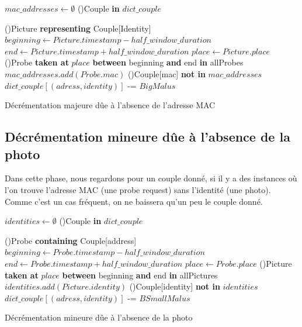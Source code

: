 \begin{algorithm2e}[H]
	\SetAlgoLined
	$mac\_addresses  \gets \emptyset $\;
	\ForEach(){Couple \textbf{in} $dict\_couple$}{
		 \ForEach(){Picture \textbf{representing} Couple[Identity]}{
			$beginning \gets Picture.timestamp - half\_window\_duration$\;
			$end \gets Picture.timestamp + half\_window\_duration$\;
			$place \gets Picture.place$\; 
			\ForEach(){Probe \textbf{taken at} $place$ \textbf{between} beginning \textbf{and} end \textbf{in} allProbes}{
				$mac\_addresses.add(Probe.mac)$
			 }
			}
		\If(){Couple[mac] \textbf{not in} $mac\_addresses$}{
			$dict\_couple[(adress, identity)]$ -= $BigMalus$\;
		}

		}
	\caption{Décrémentation majeure dûe à l'absence de l'adresse MAC}
\end{algorithm2e}


\subsection{Décrémentation mineure dûe à l'absence de la photo}
Dans cette phase, nous regardons pour un couple donné, si il y a des instances où l'on trouve 
l'adresse MAC (une probe request) sans l'identité (une photo). Comme c'est un cas fréquent, on ne baissera qu'un peu le couple donné. 


\begin{algorithm2e}[H]
	\SetAlgoLined
	$identities  \gets \emptyset $\;
	\ForEach(){Couple \textbf{in} $dict\_couple$}{
		 \ForEach(){Probe \textbf{containing} Couple[address]}{
			$beginning \gets Probe.timestamp - half\_window\_duration$\;
			$end \gets Probe.timestamp + half\_window\_duration$\;
			$place \gets Probe.place$\; 
			\ForEach(){Picture \textbf{taken at} $place$ \textbf{between} beginning \textbf{and} end \textbf{in} allPictures}{
				$identities.add(Picture.identity)$
			 }
			}
		\If(){Couple[identity] \textbf{not in} $identities$}{
			$dict\_couple[(adress, identity)]$ -= $BSmallMalus$\;
		}

		}
	\caption{Décrémentation mineure dûe à l'absence de la photo}
\end{algorithm2e}

